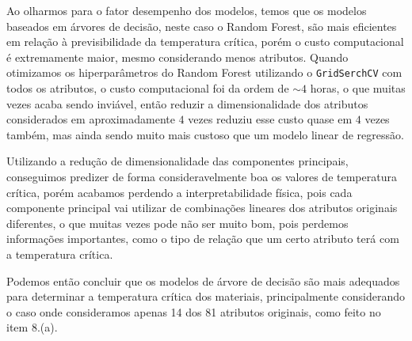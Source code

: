 Ao olharmos para o fator desempenho dos modelos, temos que os modelos baseados em árvores de decisão, neste caso o Random Forest, são mais eficientes em relação à previsibilidade da temperatura crítica, porém o custo computacional é extremamente maior, mesmo considerando menos atributos. Quando otimizamos os hiperparâmetros do Random Forest utilizando o \verb|GridSerchCV| com todos os atributos, o custo computacional foi da ordem de $\sim 4$ horas, o que muitas vezes acaba sendo inviável, então reduzir a dimensionalidade dos atributos considerados em aproximadamente $4$ vezes reduziu esse custo quase em $4$ vezes também, mas ainda sendo muito mais custoso que um modelo linear de regressão.

Utilizando a redução de dimensionalidade das componentes principais, conseguimos predizer de forma consideravelmente boa os valores de temperatura crítica, porém acabamos perdendo a interpretabilidade física, pois cada componente principal vai utilizar de combinações lineares dos atributos originais diferentes, o que muitas vezes pode não ser muito bom, pois perdemos informações importantes, como o tipo de relação que um certo atributo terá com a temperatura crítica.

Podemos então concluir que os modelos de árvore de decisão são mais adequados para determinar a temperatura crítica dos materiais, principalmente considerando o caso onde consideramos apenas 14 dos 81 atributos originais, como feito no item 8.(a).